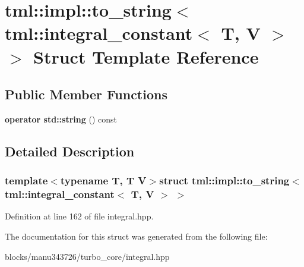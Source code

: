 \hypertarget{structtml_1_1impl_1_1to__string_3_01tml_1_1integral__constant_3_01_t_00_01_v_01_4_01_4}{\section{tml\+:\+:impl\+:\+:to\+\_\+string$<$ tml\+:\+:integral\+\_\+constant$<$ T, V $>$ $>$ Struct Template Reference}
\label{structtml_1_1impl_1_1to__string_3_01tml_1_1integral__constant_3_01_t_00_01_v_01_4_01_4}
}
\subsection*{Public Member Functions}
\begin{DoxyCompactItemize}
\item 
\hypertarget{structtml_1_1impl_1_1to__string_3_01tml_1_1integral__constant_3_01_t_00_01_v_01_4_01_4_ad3c348acc1e162643fce6bdd3ea71d69}{{\bfseries operator std\+::string} () const }\label{structtml_1_1impl_1_1to__string_3_01tml_1_1integral__constant_3_01_t_00_01_v_01_4_01_4_ad3c348acc1e162643fce6bdd3ea71d69}

\end{DoxyCompactItemize}


\subsection{Detailed Description}
\subsubsection*{template$<$typename T, T V$>$struct tml\+::impl\+::to\+\_\+string$<$ tml\+::integral\+\_\+constant$<$ T, V $>$ $>$}



Definition at line 162 of file integral.\+hpp.



The documentation for this struct was generated from the following file\+:\begin{DoxyCompactItemize}
\item 
blocks/manu343726/turbo\+\_\+core/integral.\+hpp\end{DoxyCompactItemize}
